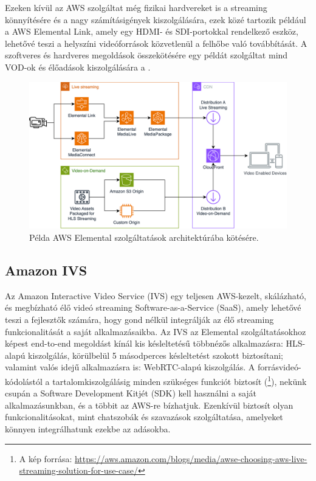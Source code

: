 Ezeken kívül az AWS szolgáltat még fizikai hardvereket is a streaming könnyítésére és a nagy számításigények kiszolgálására, ezek közé tartozik például a AWS Elemental Link, amely egy HDMI- és SDI-portokkal rendelkező eszköz, lehetővé teszi a helyszíni videóforrások közvetlenül a felhőbe való továbbítását. A szoftveres és hardveres megoldások összekötésére egy példát szolgáltat mind VOD-ok és élőadások kiszolgálására a .

\begin{figure}[ht]
	\centering
	\includegraphics[width=120mm, keepaspectratio]{figures/dipterv_vodlive.png}
	\caption{Példa AWS Elemental szolgáltatások architektúrába kötésére.}
	\label{fig:vodlive}
\end{figure}

\subsection{Amazon IVS}

Az Amazon Interactive Video Service (IVS) egy teljesen AWS-kezelt, skálázható, és megbízható élő videó streaming Software-as-a-Service (SaaS), amely lehetővé teszi a fejlesztők számára, hogy gond nélkül integrálják az élő streaming funkcionalitását a saját alkalmazásaikba. Az IVS az Elemental szolgáltatásokhoz képest end-to-end megoldást kínál kis késleltetésű többnézős alkalmazásra: HLS-alapú kiszolgálás, körülbelül 5 másodperces késleltetést szokott biztosítani; valamint valós idejű alkalmazásra is: WebRTC-alapú kiszolgálás. \cite{Ivs} A forrásvideó-kódolástól a tartalomkiszolgálásig minden szükséges funkciót biztosít (\footnote{A kép forrása: \url{https://aws.amazon.com/blogs/media/awse-choosing-aws-live-streaming-solution-for-use-case/}}), nekünk csupán a Software Development Kitjét (SDK) kell használni a saját alkalmazásunkban, és a többit az AWS-re bízhatjuk. Ezenkívül biztosít olyan funkcionalitásokat, mint chatszobák és szavazások szolgáltatása, amelyeket könnyen integrálhatunk ezekbe az adásokba.

